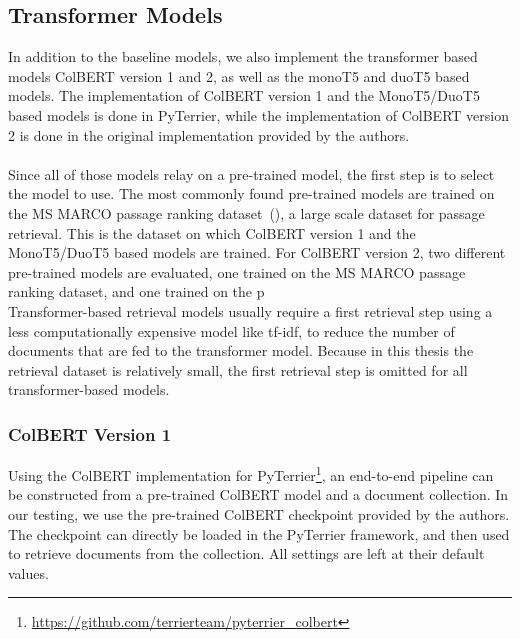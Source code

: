 \subsection{Transformer Models}
In addition to the baseline models, we also implement the transformer based models ColBERT version 1 and 2, as well as the monoT5 and duoT5 based models.
The implementation of ColBERT version 1 and the MonoT5/DuoT5 based models is done in PyTerrier, while the implementation of ColBERT version 2 is done in the original implementation provided by the authors.
\\\\
Since all of those models relay on a pre-trained model, the first step is to select the model to use.
The most commonly found pre-trained models are trained on the MS MARCO passage ranking dataset~(\cite{bajaj:2016}), a large scale dataset for passage retrieval.
This is the dataset on which ColBERT version 1 and the MonoT5/DuoT5 based models are trained.
For ColBERT version 2, two different pre-trained models are evaluated, one trained on the MS MARCO passage ranking dataset, and one trained on the p
\\
Transformer-based retrieval models usually require a first retrieval step using a less computationally expensive model like tf-idf, to reduce the number of documents that are fed to the transformer model.
Because in this thesis the retrieval dataset is relatively small, the first retrieval step is omitted for all transformer-based models.

\subsubsection{ColBERT Version 1}
Using the ColBERT implementation for PyTerrier\footnote{\url{https://github.com/terrierteam/pyterrier_colbert}}, an end-to-end pipeline can be constructed from a pre-trained ColBERT model and a document collection.
In our testing, we use the pre-trained ColBERT checkpoint provided by the authors.
\\
The checkpoint can directly be loaded in the PyTerrier framework, and then used to retrieve documents from the collection.
All settings are left at their default values.

